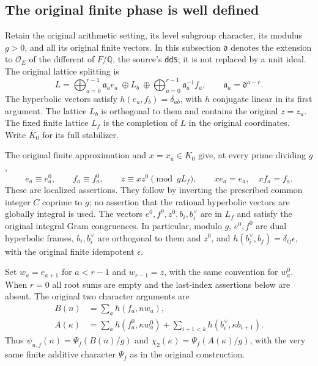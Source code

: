\subsection{The original finite phase is well defined}
\label{global-gram-finite-phases}

Retain the original arithmetic setting, its level subgroup character,
its modulus $g>0$, and all its original finite vectors.  In this
subsection $\mathfrak d$ denotes the extension to $\mathcal O_E$ of
the different of $F/\mathbb Q$, the source's \texttt{ddS}; it is
not replaced by a unit ideal.  The original lattice splitting is
\begin{equation}\label{global-gram-phase-split}
 L=\bigoplus_{a=0}^{r-1}\mathfrak a_a e_a\ \oplus L_b\ \oplus
                      \bigoplus_{a=0}^{r-1}\mathfrak a_a^{-1}f_a,
 \qquad \mathfrak a_a=\mathfrak d^{a-r}.
\end{equation}
The hyperbolic vectors satisfy $h(e_a,f_b)=\delta_{ab}$, with
$h$ conjugate linear in its first argument.  The lattice $L_b$ is
orthogonal to them and contains the original $z=z_u$.
The fixed finite lattice $L_f$ is the completion of $L$ in the
original coordinates.  Write $K_0$ for its full stabilizer.

The original finite approximation and $x=x_u\in K_0$ give, at
every prime dividing $g$,
\begin{equation}\label{global-gram-phase-congruence}
 e_a\equiv e_a^0,\qquad f_a\equiv f_a^0,\qquad
 z\equiv xz^0\pmod{gL_f},\qquad xe_a=e_a,\quad xf_a=f_a.
\end{equation}
These are localized assertions.  They follow by inverting the
prescribed common integer $C$ coprime to $g$; no assertion that
the rational hyperbolic vectors are globally integral is used.
The vectors $e^0,f^0,z^0,b_i,b_i^\vee$ are in $L_f$ and satisfy
the original integral Gram congruences.  In particular, modulo
$g$, $e^0,f^0$ are dual hyperbolic frames,
$b_i,b_i^\vee$ are orthogonal to them and $z^0$, and
$h(b_i^\vee,b_j)=\delta_{ij}\epsilon$, with the original finite
idempotent $\epsilon$.\cite{global-gram-phase-source}

Set $w_a=e_{a+1}$ for $a<r-1$ and $w_{r-1}=z$, with the same
convention for $w_a^0$.  When $r=0$ all root sums are empty and
the last-index assertions below are absent.  The original two
character arguments are
\begin{align*}
 B(n)&=\sum_a h(f_a,nw_a),\\
 A(\kappa)&=\sum_a h(f_a^0,\kappa w_a^0)
                  +\sum_{i+1<k}h(b_i^\vee,\kappa b_{i+1}).
\end{align*}
Thus $\psi_{u,f}(n)=\Psi_f(B(n)/g)$ and
$\chi_2(\kappa)=\Psi_f(A(\kappa)/g)$, with the very same finite
additive character $\Psi_f$ as in the original construction.

